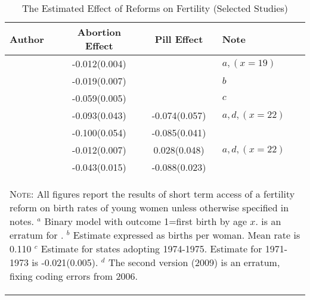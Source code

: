 \begin{table}[htpb!]
\caption{The Estimated Effect of Reforms on Fertility (Selected Studies)}
\begin{tabular}{lccl} \toprule
Author & Abortion Effect & Pill Effect & Note \\ \midrule
\citet{AngristEvans1996}      & -0.012(0.004) &               & $a,(x=19)$   \\
\citet{Levineetal1996}        & -0.019(0.007) &               & $b$          \\
\citet{Gruberetal1999}        & -0.059(0.005) &               & $c$          \\
\citet{Bailey2006}            & -0.093(0.043) & -0.074(0.057) & $a,d,(x=22)$ \\
\citet{Guldi2008}             & -0.100(0.054) & -0.085(0.041) &              \\
\citet{Bailey2009}            & -0.012(0.007) &  0.028(0.048) & $a,d,(x=22)$ \\
\citet{OltmansHungerman2012}  & -0.043(0.015) & -0.088(0.023) &              \\
\bottomrule
\multicolumn{4}{p{12.2cm}}{\begin{footnotesize}\textsc{Note:} All figures report 
the results of short term access of a fertility reform on birth rates of young 
women unless otherwise specified in notes. \newline 
$^a$ Binary model with outcome 1=first birth by age $x$. \citet{Bailey2009} is
an erratum for \citeyear{Bailey2006}.\newline
$^b$ Estimate expressed as births per woman.  Mean rate is 0.110 \newline 
$^c$ Estimate for states adopting 1974-1975. Estimate for 1971-1973 is 
-0.021(0.005). \newline
$^d$ The second version (2009) is an erratum, fixing coding errors from 2006.
\end{footnotesize}} \\
\end{tabular}
\end{table}

